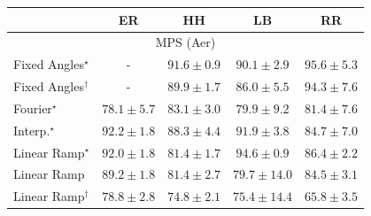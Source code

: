 \begin{tabular}{l|cccc|}
\toprule
            & ER & HH & LB & RR \\
\midrule
\multicolumn{5}{c}{\rule{0pt}{8pt}MPS (Aer)} \\
\midrule
Fixed Angles$^\star$ & {\cellcolor[HTML]{000000}} \color[HTML]{F1F1F1} {\cellcolor{white}} \color{black} - & {\cellcolor[HTML]{790D75}} \color[HTML]{F1F1F1} $91.6\pm 0.9$ & {\cellcolor[HTML]{82147F}} \color[HTML]{F1F1F1} $90.1\pm 2.9$ & {\cellcolor[HTML]{550253}} \color[HTML]{F1F1F1} $95.6\pm 5.3$ \\
Fixed Angles$^\dagger$ & {\cellcolor[HTML]{000000}} \color[HTML]{F1F1F1} {\cellcolor{white}} \color{black} - & {\cellcolor[HTML]{821781}} \color[HTML]{F1F1F1} $89.9\pm 1.7$ & {\cellcolor[HTML]{873897}} \color[HTML]{F1F1F1} $86.0\pm 5.5$ & {\cellcolor[HTML]{61065D}} \color[HTML]{F1F1F1} $94.3\pm 7.6$ \\
Fourier$^\star$ & {\cellcolor[HTML]{8C75B6}} \color[HTML]{F1F1F1} $78.1\pm 5.7$ & {\cellcolor[HTML]{8950A4}} \color[HTML]{F1F1F1} $83.1\pm 3.0$ & {\cellcolor[HTML]{8C68AF}} \color[HTML]{F1F1F1} $79.9\pm 9.2$ & {\cellcolor[HTML]{8B5CAA}} \color[HTML]{F1F1F1} $81.4\pm 7.6$ \\
Interp.$^\star$ & {\cellcolor[HTML]{740B70}} \color[HTML]{F1F1F1} $92.2\pm 1.8$ & {\cellcolor[HTML]{84258B}} \color[HTML]{F1F1F1} $88.3\pm 4.4$ & {\cellcolor[HTML]{760C71}} \color[HTML]{F1F1F1} $91.9\pm 3.8$ & {\cellcolor[HTML]{88449E}} \color[HTML]{F1F1F1} $84.7\pm 7.0$ \\
Linear Ramp$^\star$ & {\cellcolor[HTML]{760C71}} \color[HTML]{F1F1F1} $92.0\pm 1.8$ & {\cellcolor[HTML]{8B5CAA}} \color[HTML]{F1F1F1} $81.4\pm 1.7$ & {\cellcolor[HTML]{5D055A}} \color[HTML]{F1F1F1} $94.6\pm 0.9$ & {\cellcolor[HTML]{863595}} \color[HTML]{F1F1F1} $86.4\pm 2.2$ \\
Linear Ramp & {\cellcolor[HTML]{831C84}} \color[HTML]{F1F1F1} $89.2\pm 1.8$ & {\cellcolor[HTML]{8B5CAA}} \color[HTML]{F1F1F1} $81.4\pm 2.7$ & {\cellcolor[HTML]{8C69B0}} \color[HTML]{F1F1F1} $79.7\pm 14.0$ & {\cellcolor[HTML]{88459F}} \color[HTML]{F1F1F1} $84.5\pm 3.1$ \\
Linear Ramp$^\dagger$ & {\cellcolor[HTML]{8C70B3}} \color[HTML]{F1F1F1} $78.8\pm 2.8$ & {\cellcolor[HTML]{8C8DC2}} \color[HTML]{F1F1F1} $74.8\pm 2.1$ & {\cellcolor[HTML]{8C89C0}} \color[HTML]{F1F1F1} $75.4\pm 14.4$ & {\cellcolor[HTML]{ABC5DF}} \color[HTML]{000000} $65.8\pm 3.5$ \\

\end{tabular}
